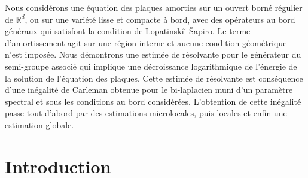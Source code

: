 \documentclass[JEP,XML,SOM,Unicode,published]{cedram}
\theoremstyle{plain}
\theoremstyle{definition}
\begin{document}
\begin{altabstract}
Nous considérons une équation des plaques amorties sur un ouvert borné régulier de $\mathbb{R}^d$, ou sur une variété lisse et compacte à bord, avec des opérateurs au bord généraux qui satisfont la condition de Lopatinski\u{\i}-\v{S}apiro. Le terme d'amortissement agit sur une région interne et aucune condition géométrique n'est imposée. Nous démontrons une estimée de résolvante pour le générateur du semi-groupe associé qui implique une décroissance logarithmique de l'énergie de la solution de l'équation des plaques. Cette estimée de résolvante est conséquence d'une inégalité de Carleman obtenue pour le bi-laplacien muni d'un paramètre spectral et sous les conditions au bord considérées. L'obtention de cette inégalité passe tout d'abord par des estimations microlocales, puis locales et enfin une estimation globale.
\end{altabstract}
\maketitle
\vspace*{-\baselineskip}
\tableofcontents
\mainmatter

\section{Introduction}
\end{document}
